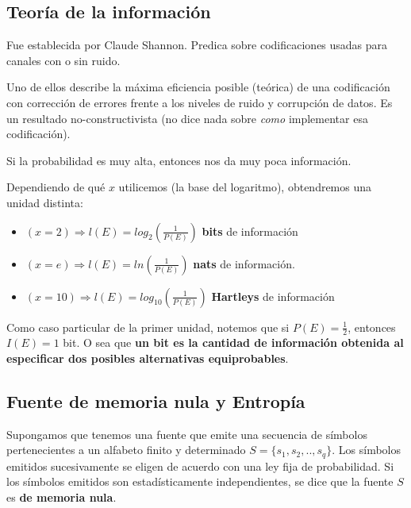 \documentclass[]{article}
\begin{document}
\subsection{Teoría de la información}
Fue establecida por Claude Shannon. Predica sobre codificaciones usadas para canales con o sin ruido.

Uno de ellos describe la máxima eficiencia posible (teórica) de una codificación con corrección de errores frente a los niveles de ruido y corrupción de datos. Es un resultado no-constructivista (no dice nada sobre \emph{como} implementar esa codificación).


Si la probabilidad es muy alta, entonces nos da muy poca información.

Dependiendo de qué $x$ utilicemos (la base del logaritmo), obtendremos una unidad distinta:
\begin{itemize}
    \item $(x = 2) \Rightarrow l(E) = log_2(\frac{1}{P(E)})$ \textbf{bits} de información
    \item $(x = e) \Rightarrow l(E) = ln(\frac{1}{P(E)})$ \textbf{nats} de información.
    \item $(x = 10) \Rightarrow l(E) = log_{10}(\frac{1}{P(E)})$ \textbf{Hartleys} de información
\end{itemize}


Como caso particular de la primer unidad, notemos que si $P(E) = \frac{1}{2}$, entonces $I(E) = 1$ bit. O sea que \textbf{un bit es la cantidad de información obtenida al especificar dos posibles alternativas equiprobables}.

\subsection{Fuente de memoria nula y Entropía}
Supongamos que tenemos una fuente que emite una secuencia de símbolos pertenecientes a un alfabeto finito y determinado $S = \{s_1, s_2, .., s_q\}$. Los símbolos emitidos sucesivamente se eligen de acuerdo con una ley fija de probabilidad. Si los símbolos emitidos son estadísticamente independientes, se dice que la fuente $S$ es \textbf{de memoria nula}.
\end{document}
